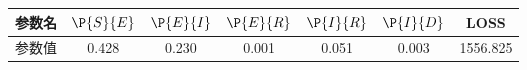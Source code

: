 \begin{tabular}{ccccccc}
\hline
参数名&$\P{S}{E}$&$\P{E}{I}$&$\P{E}{R}$&$\P{I}{R}$&$\P{I}{D}$&LOSS\\
\hline
参数值&0.428&0.230&0.001&0.051&0.003&1556.825\\
\hline
\end{tabular}